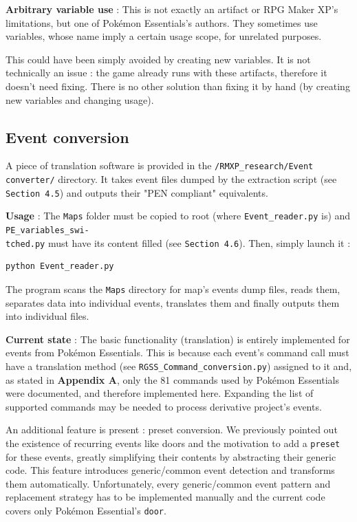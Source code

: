 \documentclass[11pt]{article}
\begin{document}
{\textbf{Arbitrary variable use} : This is not exactly an artifact or RPG Maker XP's limitations, but one of Pokémon Essentials's authors. They sometimes use variables,  whose name imply a certain usage scope, for unrelated purposes. 

This could have been simply avoided by creating new variables. It is not technically an issue : the game already runs with these artifacts, therefore it doesn't need fixing. There is no other solution than fixing it by hand (by creating new variables and changing usage).




\subsection{Event conversion}

A piece of translation software is provided in the \texttt{/RMXP\_research/Event converter/} directory. It takes event files dumped by the extraction script (see \texttt{Section 4.5}) and outputs their "PEN compliant" equivalents.

\textbf{Usage} : The \texttt{Maps} folder must be copied to root (where \texttt{Event\_reader.py} is) and \texttt{PE\_variables\_swi-\\tched.py} must have its content filled (see \texttt{Section 4.6}). Then, simply launch it :

\begin{lstlisting}
python Event_reader.py\end{lstlisting}
\vspace{-8mm}

The program scans the \texttt{Maps} directory for map's events dump files, reads them, separates data into individual events, translates them and finally outputs them into individual files.

\textbf{Current state} : The basic functionality (translation) is entirely implemented for events from Pokémon Essentials. This is because each event's command call must have a translation method (see \texttt{RGSS\_Command\_conversion.py}) assigned to it and, as stated in \textbf{Appendix A}, only the 81 commands used by Pokémon Essentials were documented, and therefore implemented here. Expanding the list of supported commands may be needed to process derivative project's events.

An additional feature is present : preset conversion. We previously pointed out the existence of recurring events like doors and the motivation to add a \texttt{preset} for these events, greatly simplifying their contents by abstracting their generic code. This feature introduces generic/common event detection and transforms them automatically. Unfortunately, every generic/common event pattern and replacement strategy has to be implemented manually and the current code covers only Pokémon Essential's \texttt{door}. 







}
\end{document}
